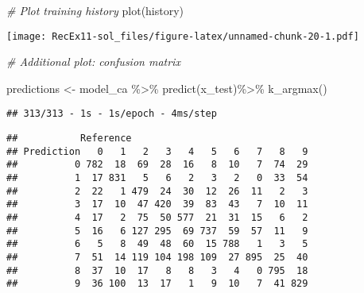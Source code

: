 \documentclass[
]{article}
\newenvironment{Shaded}{\begin{snugshade}}{\end{snugshade}}
\newcommand{\CommentTok}[1]{\textcolor[rgb]{0.56,0.35,0.01}{\textit{#1}}}
\newcommand{\FunctionTok}[1]{\textcolor[rgb]{0.00,0.00,0.00}{#1}}
\newcommand{\NormalTok}[1]{#1}
\newcommand{\OtherTok}[1]{\textcolor[rgb]{0.56,0.35,0.01}{#1}}
\newcommand{\SpecialCharTok}[1]{\textcolor[rgb]{0.00,0.00,0.00}{#1}}
\begin{document}
\begin{Shaded}
\begin{Highlighting}[]
\CommentTok{\# Plot training history}
\FunctionTok{plot}\NormalTok{(history)}
\end{Highlighting}
\end{Shaded}

\texttt{[image: RecEx11-sol\_files/figure-latex/unnamed-chunk-20-1.pdf]}

\begin{Shaded}
\begin{Highlighting}[]
\CommentTok{\# Additional plot: confusion matrix}

\NormalTok{predictions }\OtherTok{\textless{}{-}}\NormalTok{ model\_ca }\SpecialCharTok{\%\textgreater{}\%} \FunctionTok{predict}\NormalTok{(x\_test)}\SpecialCharTok{\%\textgreater{}\%} \FunctionTok{k\_argmax}\NormalTok{()}
\end{Highlighting}
\end{Shaded}

\begin{verbatim}
## 313/313 - 1s - 1s/epoch - 4ms/step
\end{verbatim}

\begin{Shaded}
\end{Shaded}

\begin{verbatim}
##           Reference
## Prediction   0   1   2   3   4   5   6   7   8   9
##          0 782  18  69  28  16   8  10   7  74  29
##          1  17 831   5   6   2   3   2   0  33  54
##          2  22   1 479  24  30  12  26  11   2   3
##          3  17  10  47 420  39  83  43   7  10  11
##          4  17   2  75  50 577  21  31  15   6   2
##          5  16   6 127 295  69 737  59  57  11   9
##          6   5   8  49  48  60  15 788   1   3   5
##          7  51  14 119 104 198 109  27 895  25  40
##          8  37  10  17   8   8   3   4   0 795  18
##          9  36 100  13  17   1   9  10   7  41 829
\end{verbatim}
\end{document}
